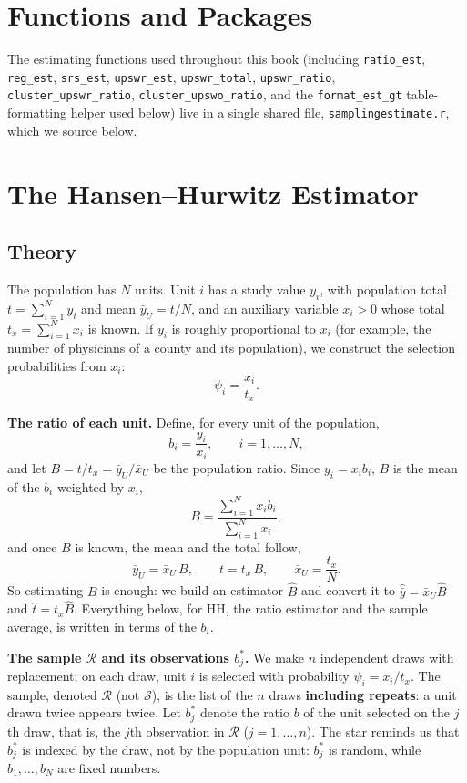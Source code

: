 \documentclass[
  letterpaper,
  DIV=11,
  numbers=noendperiod]{scrreprt}
\renewcommand{\[}{\begin{equation}}
\renewcommand{\]}{\end{equation}}
\begin{document}
\section{Functions and Packages}\label{functions-and-packages}

The estimating functions used throughout this book (including
\texttt{ratio\_est}, \texttt{reg\_est}, \texttt{srs\_est},
\texttt{upswr\_est}, \texttt{upswr\_total}, \texttt{upswr\_ratio},
\texttt{cluster\_upswr\_ratio}, \texttt{cluster\_upswo\_ratio}, and the
\texttt{format\_est\_gt} table-formatting helper used below) live in a
single shared file, \texttt{samplingestimate.r}, which we source below.

\section{The Hansen--Hurwitz Estimator}\label{sec-ups-hh}

\subsection{Theory}\label{sec-ups-hh-theory}

The population has \(N\) units. Unit \(i\) has a study value \(y_i\),
with population total \(t=\sum_{i=1}^N y_i\) and mean \(\bar{y}_U=t/N\),
and an auxiliary variable \(x_i>0\) whose total \(t_x=\sum_{i=1}^N x_i\)
is known. If \(y_i\) is roughly proportional to \(x_i\) (for example,
the number of physicians of a county and its population), we construct
the selection probabilities from \(x_i\): \[
\psi_i=\frac{x_i}{t_x}.
\]

\textbf{The ratio of each unit.} Define, for every unit of the
population, \[
b_i=\frac{y_i}{x_i},\qquad i=1,\ldots,N,
\] and let \(B=t/t_x=\bar{y}_U/\bar{x}_U\) be the population ratio.
Since \(y_i=x_ib_i\), \(B\) is the mean of the \(b_i\) weighted by
\(x_i\), \[
B=\frac{\sum_{i=1}^N x_ib_i}{\sum_{i=1}^N x_i},
\] and once \(B\) is known, the mean and the total follow, \[
\bar{y}_U=\bar{x}_U\,B,\qquad t=t_x\,B,\qquad \bar{x}_U=\frac{t_x}{N}.
\] So estimating \(B\) is enough: we build an estimator \(\hat{B}\) and
convert it to \(\hat{\bar{y}}=\bar{x}_U\hat{B}\) and
\(\hat{t}=t_x\hat{B}\). Everything below, for HH, the ratio estimator
and the sample average, is written in terms of the \(b_i\).

\textbf{The sample \(\mathcal{R}\) and its observations \(b_j^*\).} We
make \(n\) independent draws with replacement; on each draw, unit \(i\)
is selected with probability \(\psi_i=x_i/t_x\). The sample, denoted
\(\mathcal{R}\) (not \(\mathcal{S}\)), is the list of the \(n\) draws
\textbf{including repeats}: a unit drawn twice appears twice. Let
\(b_j^*\) denote the ratio \(b\) of the unit selected on the \(j\)th
draw, that is, the \(j\)th observation in \(\mathcal{R}\)
(\(j=1,\ldots,n\)). The star reminds us that \(b_j^*\) is indexed by the
draw, not by the population unit: \(b_j^*\) is random, while
\(b_1,\ldots,b_N\) are fixed numbers.
\end{document}
